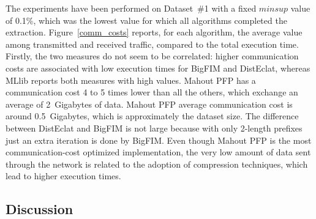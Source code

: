 \documentclass[preprint,review,12pt]{elsarticle}
\begin{document}
The experiments have been performed on Dataset~\#1 with a fixed $minsup$ value of 0.1\%,
which was the lowest value for which all algorithms completed the extraction.
Figure~\ref{comm_costs} reports, for each algorithm, the average value
among transmitted and received traffic, compared to the total execution time.
Firstly, the two measures do not seem to be correlated:
higher communication costs are associated with low execution times
for BigFIM and DistEclat, whereas MLlib reports both measures with high values.
Mahout PFP has a communication cost 4 to 5 times lower than all the others,
which exchange an average of 2~Gigabytes of data.
Mahout PFP average communication cost is around 0.5~Gigabytes,
which is approximately the dataset size.
The difference between DistEclat and BigFIM is not large because with only 2-length prefixes just an extra iteration is done by BigFIM.
Even though Mahout PFP is the most communication-cost optimized implementation,
the very low amount of data sent through the network is related
to the adoption of compression techniques, which lead to higher execution times.




\subsection{Discussion}
\end{document}
